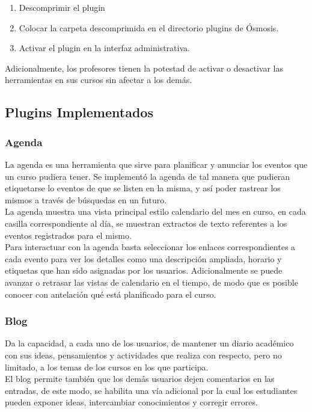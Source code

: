 \begin{enumerate}
	\item Descomprimir el plugin
	\item Colocar la carpeta descomprimida en el directorio plugins de Ósmosis.
	\item Activar el plugin en la interfaz administrativa.
\end{enumerate}

Adicionalmente, los profesores tienen la potestad de activar o desactivar las herramientas en sus cursos sin afectar a los demás.\\

\subsection {Plugins Implementados}

\subsubsection{Agenda}
La agenda es una herramienta que sirve para planificar y anunciar los eventos que un curso pudiera tener. Se implementó la agenda de tal manera que pudieran etiquetarse lo eventos de que se listen en la misma, y así poder rastrear los mismos a través de búsquedas en un futuro.\\

La agenda muestra una vista principal estilo calendario del mes en curso, en cada casilla correspondiente al día, se muestran extractos de texto referentes a los eventos registrados para el mismo.\\

Para interactuar con la agenda basta seleccionar los enlaces correspondientes a cada evento para ver los detalles como una descripción ampliada, horario y etiquetas que han sido asignadas por los usuarios. Adicionalmente se puede avanzar o retrasar las vistas de calendario en el tiempo, de modo que es posible conocer con antelación qué está planificado para el curso.


\subsubsection{Blog}
Da la capacidad, a cada uno de los usuarios, de mantener un diario académico con sus ideas, pensamientos y actividades que realiza con respecto, pero no limitado, a los temas de los cursos en los que participa.\\

El blog permite también que los demás usuarios dejen comentarios en las entradas, de este modo, se habilita una vía adicional por la cual los estudiantes pueden exponer ideas, intercambiar conocimientos y corregir errores.

